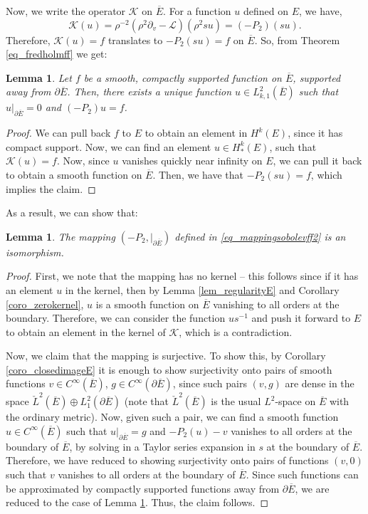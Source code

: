 \documentclass[10pt, a4paper]{article}
\theoremstyle{plain}%
\newtheorem{lem}[theorem]{Lemma}
\theoremstyle{definition}
\numberwithin{figure}{section}
\numberwithin{equation}{section}
\newcommand{\pa}{\partial}
\newcommand{\cL}{\mathcal{L}}
\newcommand{\oE}{{\overline{E}}}
\newcommand{\chL}{\check{L}}
\newcommand{\cK}{\mathcal{K}}
\begin{document}
Now, we write the operator $\cK$ on $\oE$. For a function $u$ defined on $E$, we have,
\[
\cK(u) = \rho^{-2}(\rho^2\pa_v-\cL)(\rho^2su) = (-P_2)(su).
\]
Therefore, $\cK(u)=f$ translates to $-P_2(su) = f$ on $\oE$. So, from Theorem \ref{eq_fredholmff} we get:
\begin{lem}\label{lem_Lotay--Neves}
	Let $f$ be a smooth, compactly supported function on $\oE$, supported away from $\pa\oE$. Then, there exists a unique function $u\in L^2_{k,1}(\oE)$ such that $u|_{\pa\oE}=0$ and $(-P_2)u=f$. 
\end{lem}
\begin{proof}
	We can pull back $f$ to $E$ to obtain an element in $H^k(E)$, since it has compact support. Now, we can find an element $u\in H^k_*(E)$, such that $\cK(u)=f$. Now, since $u$ vanishes quickly near infinity on $E$, we can pull it back to obtain a smooth function on $\oE$. Then, we have that $-P_2(su)=f$, which implies the claim.
\end{proof}

As a result, we can show that:

\begin{lem}\label{lem_p2isomorphism}
	The mapping $(-P_2,|_{\pa\oE})$ defined in \eqref{eq_mappingsobolevff2} is an isomorphism.
\end{lem}
\begin{proof}
	First, we note that the mapping has no kernel -- this follows since if it has an element $u$ in the kernel, then by Lemma \ref{lem_regularityE} and Corollary \ref{coro_zerokernel}, $u$ is a smooth function on $\oE$ vanishing to all orders at the boundary. Therefore, we can consider the function $us^{-1}$ and push it forward to $E$ to obtain an element in the kernel of $\cK$, which is a contradiction. 
	
	Now, we claim that the mapping is surjective. To show this, by Corollary \ref{coro_closedimageE} it is enough to show surjectivity onto pairs of smooth functions $v\in C^\infty(\oE)$, $g\in C^\infty(\pa\oE)$, since such pairs $(v,g)$ are dense in the space $\chL^2(\oE)\oplus L^2_1(\pa\oE)$ (note that $\chL^2(\oE)$ is the usual $L^2$-space on $\oE$ with the ordinary metric). Now, given such a pair, we can find a smooth function $u\in C^\infty (\oE)$ such that $u|_{\pa\oE}=g$ and $-P_2(u)-v$ vanishes to all orders at the boundary of $\oE$, by solving in a Taylor series expansion in $s$ at the boundary of $\oE$. Therefore, we have reduced to showing surjectivity onto pairs of functions $(v,0)$ such that $v$ vanishes to all orders at the boundary of $\oE$. Since such functions can be approximated by compactly supported functions away from $\pa\oE$, we are reduced to the case of Lemma \ref{lem_Lotay--Neves}. Thus, the claim follows. 
\end{proof}
 
\end{document}
